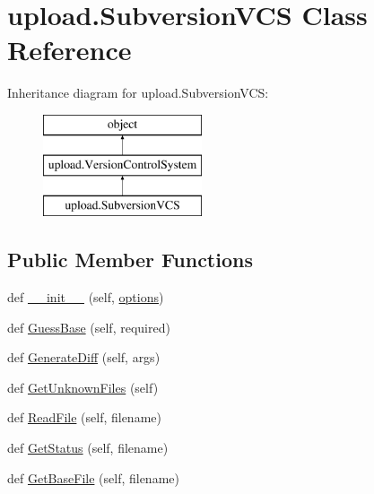 \hypertarget{classupload_1_1_subversion_v_c_s}{}\section{upload.\+Subversion\+V\+C\+S Class Reference}
\label{classupload_1_1_subversion_v_c_s}
Inheritance diagram for upload.\+Subversion\+V\+C\+S\+:\begin{figure}[H]
\begin{center}
\leavevmode
\includegraphics[height=3.000000cm]{classupload_1_1_subversion_v_c_s}
\end{center}
\end{figure}
\subsection*{Public Member Functions}
\begin{DoxyCompactItemize}
\item 
def \hyperlink{classupload_1_1_subversion_v_c_s_a8333f94e27335ce83eed0cc3f5a1eeb0}{\+\_\+\+\_\+init\+\_\+\+\_\+} (self, \hyperlink{classupload_1_1_version_control_system_a4d57d043bc408887b94269fe4cea9556}{options})
\item 
def \hyperlink{classupload_1_1_subversion_v_c_s_a7d22d459469a757270502ce0dccacbd2}{Guess\+Base} (self, required)
\item 
def \hyperlink{classupload_1_1_subversion_v_c_s_a07c2d341f2c7df2772dd7f85e89b0212}{Generate\+Diff} (self, args)
\item 
def \hyperlink{classupload_1_1_subversion_v_c_s_a494ba1010992d83cac015bc396ab693a}{Get\+Unknown\+Files} (self)
\item 
def \hyperlink{classupload_1_1_subversion_v_c_s_a340d269b74386ac863636f6b0683d9f4}{Read\+File} (self, filename)
\item 
def \hyperlink{classupload_1_1_subversion_v_c_s_ac3785eb1fa561088206d01570f9fe982}{Get\+Status} (self, filename)
\item 
def \hyperlink{classupload_1_1_subversion_v_c_s_a29dec4941de0824734d6842a2f33ffc3}{Get\+Base\+File} (self, filename)
\end{DoxyCompactItemize}
